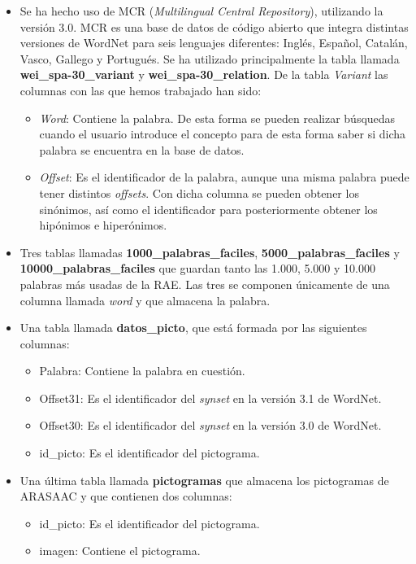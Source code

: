 \begin{itemize}
	\item Se ha hecho uso de MCR (\textit{Multilingual Central Repository}), utilizando la versión 3.0. 
	MCR es una base de datos de código abierto que integra distintas versiones de WordNet para seis lenguajes diferentes: Inglés, Español, Catalán, Vasco, Gallego y Portugués. Se ha utilizado principalmente la tabla llamada \textbf{wei\_spa-30\_variant} y \textbf{wei\_spa-30\_relation}. De la tabla \textit{Variant} las columnas con las que hemos trabajado han sido:
	\begin{itemize}
		\item \textit{Word}: Contiene la palabra. De esta forma se pueden realizar búsquedas cuando el usuario introduce el concepto para de esta forma saber si dicha palabra se encuentra en la base de datos.
		\item \textit{Offset}: Es el identificador de la palabra, aunque una misma palabra puede tener distintos \textit{offsets}. Con dicha columna se pueden obtener los sinónimos, así como el identificador para posteriormente obtener los hipónimos e hiperónimos.
	\end{itemize}
	\item Tres tablas llamadas \textbf{1000\_palabras\_faciles}, \textbf{5000\_palabras\_faciles} y \textbf{10000\_palabras\_faciles} que guardan tanto las 1.000, 5.000 y 10.000 palabras más usadas de la RAE. Las tres se componen únicamente de una columna llamada \textit{word} y que almacena la palabra.
	\item Una tabla llamada \textbf{datos\_picto}, que está formada por las siguientes columnas:
	\begin{itemize}
		\item Palabra: Contiene la palabra en cuestión. 
		\item Offset31: Es el identificador del \textit{synset} en la versión 3.1 de WordNet.
		\item Offset30: Es el identificador del \textit{synset} en la versión 3.0 de WordNet.
		\item id\_picto: Es el identificador del pictograma.
	\end{itemize}
	\item Una última tabla llamada \textbf{pictogramas} que almacena los pictogramas de ARASAAC y que contienen dos columnas: 
	\begin{itemize}
		\item id\_picto: Es el identificador del pictograma.
		\item imagen: Contiene el pictograma.
	\end{itemize}
	
\end{itemize}



